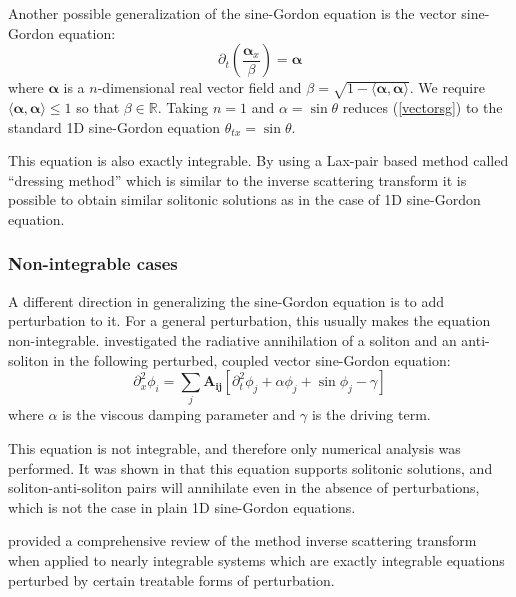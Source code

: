 \documentclass{report}
\begin{document}
\medbreak
Another possible generalization of the sine-Gordon equation is the vector sine-Gordon equation:
\begin{equation}\label{vectorsg}
  \partial_t\left(\frac{\bm{\alpha}_x}{\beta}\right) = \bm{\alpha}
\end{equation}
where $\bm{\alpha}$ is a $n$-dimensional real vector field and $\beta = \sqrt{1 - \langle\bm{\alpha},\bm{\alpha}\rangle}$. We require $\langle\bm{\alpha},\bm{\alpha}\rangle\le1$ so that $\beta\in\mathbb{R}$. Taking $n=1$ and $\alpha = \sin \theta$ reduces (\ref{vectorsg}) to the standard 1D sine-Gordon equation $\theta_{tx} = \sin \theta$.

This equation is also exactly integrable. By using a Lax-pair based method called ``dressing method'' which is similar to the inverse scattering transform \cite{Mikhailov201653} it is possible to obtain similar solitonic solutions as in the case of 1D sine-Gordon equation.

\subsubsection{Non-integrable cases}
A different direction in generalizing the sine-Gordon equation is to add perturbation to it. For a general perturbation, this usually makes the equation non-integrable. \cite{PhysRevB.85.134525} investigated the radiative annihilation of a soliton and an anti-soliton in the following perturbed, coupled vector sine-Gordon equation:
\begin{equation}
  \partial^2_x\phi_i=\sum_j \mathbf{A_{ij}} \left[\partial^2_t \phi_j +\alpha \phi_j +\sin \phi_j - \gamma\right]
\end{equation}
where $\alpha$ is the viscous damping parameter and $\gamma$ is the driving term.

This equation is not integrable, and therefore only numerical analysis was performed. It was shown in \cite{PhysRevB.85.134525} that this equation supports solitonic solutions, and soliton-anti-soliton pairs will annihilate even in the absence of perturbations, which is not the case in plain 1D sine-Gordon equations.

\cite{RevModPhys.61.763} provided a comprehensive review of the method inverse scattering transform when applied to nearly integrable systems which are exactly integrable equations perturbed by certain treatable forms of perturbation.

\medbreak
\end{document}
